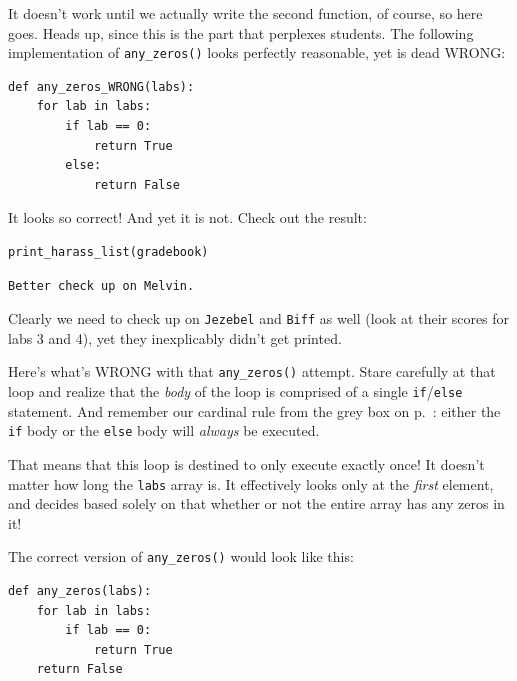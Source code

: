 It doesn't work until we actually write the second function, of course, so here
goes. Heads up, since this is the part that perplexes students. The following
implementation of \texttt{any\_zeros()} looks perfectly reasonable, yet is dead
WRONG:

\begin{Verbatim}[fontsize=\small,samepage=true,frame=single,framesep=3mm]
def any_zeros_WRONG(labs):
    for lab in labs:
        if lab == 0:
            return True
        else:
            return False
\end{Verbatim}

It looks so correct! And yet it is not. Check out the result:

\begin{Verbatim}[fontsize=\small,samepage=true,frame=single,framesep=3mm]
print_harass_list(gradebook)
\end{Verbatim}
\vspace{-.2in}

\begin{Verbatim}[fontsize=\small,samepage=true,frame=leftline,framesep=5mm,framerule=1mm]
Better check up on Melvin.
\end{Verbatim}

Clearly we need to check up on \texttt{Jezebel} and \texttt{Biff} as well (look
at their scores for labs 3 and 4), yet they inexplicably didn't get printed.


Here's what's WRONG with that \texttt{any\_zeros()} attempt. Stare carefully at
that loop and realize that the \textit{body} of the loop is comprised of a
single \texttt{if}/\texttt{else} statement. And remember our cardinal rule from
the grey box on p.~\pageref{cardinalRule}: either the \texttt{if} body or the
\texttt{else} body will \textit{always} be executed.

That means that this loop is destined to only execute exactly once! It doesn't
matter how long the \texttt{labs} array is. It effectively looks only at the
\textit{first} element, and decides based solely on that whether or not the
entire array has any zeros in it!

The correct version of \texttt{any\_zeros()} would look like this:

\begin{Verbatim}[fontsize=\small,samepage=true,frame=single,framesep=3mm]
def any_zeros(labs):
    for lab in labs:
        if lab == 0:
            return True
    return False
\end{Verbatim}

